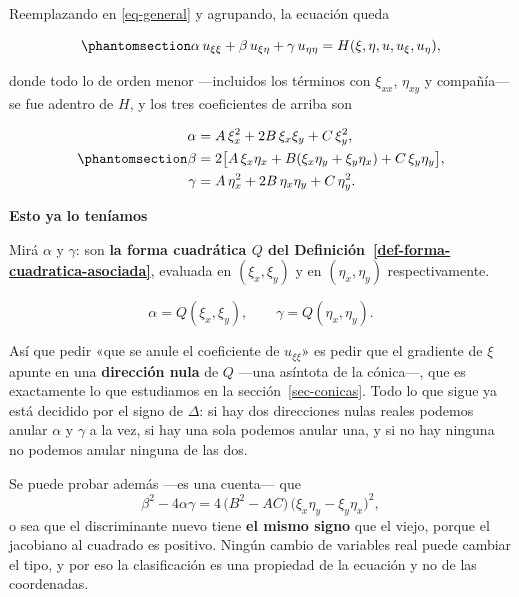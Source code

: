 \documentclass[
  spanish,
  a4paper,
]{scrbook}
\theoremstyle{definition}
\theoremstyle{plain}
\theoremstyle{definition}
\theoremstyle{plain}
\theoremstyle{definition}
\theoremstyle{remark}
\begin{document}
Reemplazando en \ref{eq-general} y agrupando, la ecuación queda

\begin{equation}\protect\phantomsection\label{eq-transformada}{
\alpha\,u_{\xi\xi} + \beta\,u_{\xi\eta} + \gamma\,u_{\eta\eta} = H(\xi,\eta,u,u_\xi,u_\eta),
}\end{equation}

donde todo lo de orden menor ---incluidos los términos con \(\xi_{xx}\),
\(\eta_{xy}\) y compañía--- se fue adentro de \(H\), y los tres
coeficientes de arriba son

\begin{equation}\protect\phantomsection\label{eq-alfa-beta-gamma}{
\begin{aligned}
\alpha &= A\,\xi_x^2 + 2B\,\xi_x\xi_y + C\,\xi_y^2, \\
\beta  &= 2\big[A\,\xi_x\eta_x + B(\xi_x\eta_y + \xi_y\eta_x) + C\,\xi_y\eta_y\big], \\
\gamma &= A\,\eta_x^2 + 2B\,\eta_x\eta_y + C\,\eta_y^2 .
\end{aligned}
}\end{equation}

\begin{tcolorbox}[enhanced jigsaw, arc=.35mm, bottomrule=.15mm, breakable, colback=white, colframe=quarto-callout-tip-color-frame, left=2mm, leftrule=.75mm, opacityback=0, rightrule=.15mm, toprule=.15mm]
\begin{minipage}[t]{5.5mm}
\textcolor{quarto-callout-tip-color}{\faLightbulb}
\end{minipage}%
\begin{minipage}[t]{\textwidth - 5.5mm}

\vspace{-3mm}\textbf{Esto ya lo teníamos}\vspace{3mm}

Mirá \(\alpha\) y \(\gamma\): son \textbf{la forma cuadrática \(Q\) del
Definición~\ref{def-forma-cuadratica-asociada}}, evaluada en
\((\xi_x,\xi_y)\) y en \((\eta_x,\eta_y)\) respectivamente.

\[\alpha = Q(\xi_x,\xi_y), \qquad \gamma = Q(\eta_x,\eta_y).\]

Así que pedir «que se anule el coeficiente de \(u_{\xi\xi}\)» es pedir
que el gradiente de \(\xi\) apunte en una \textbf{dirección nula} de
\(Q\) ---una asíntota de la cónica---, que es exactamente lo que
estudiamos en la sección~\ref{sec-conicas}. Todo lo que sigue ya está
decidido por el signo de \(\Delta\): si hay dos direcciones nulas reales
podemos anular \(\alpha\) y \(\gamma\) a la vez, si hay una sola podemos
anular una, y si no hay ninguna no podemos anular ninguna de las dos.

Se puede probar además ---es una cuenta--- que
\[\beta^2 - 4\alpha\gamma = 4\,\big(B^2-AC\big)\,\big(\xi_x\eta_y - \xi_y\eta_x\big)^2 ,\]
o sea que el discriminante nuevo tiene \textbf{el mismo signo} que el
viejo, porque el jacobiano al cuadrado es positivo. Ningún cambio de
variables real puede cambiar el tipo, y por eso la clasificación es una
propiedad de la ecuación y no de las coordenadas.

\end{minipage}%
\end{tcolorbox}
\end{document}
